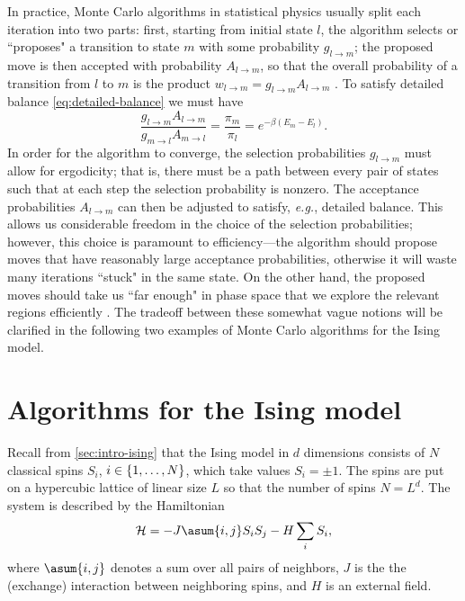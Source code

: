 In practice, Monte Carlo algorithms in statistical physics usually split each
iteration into two parts: first, starting from initial state $l$, the algorithm
selects or ``proposes" a transition to state $m$ with some probability
$g_{l \to m}$; the proposed move is then accepted with probability
$A_{l \to m}$, so that the overall probability of a transition from $l$ to $m$
is the product $w_{l \to m} = g_{l \to m} A_{l \to m}$
\autocite{newman1999monte}. To satisfy detailed balance
\eqref{eq:detailed-balance} we must have
\begin{equation}
  \frac{g_{l \to m} A_{l \to m}}{g_{m \to l} A_{m \to l}}
  = \frac{\pi_m}{\pi_l}
  = e^{-\beta(E_m - E_l)}.
  \label{eq:select-accept}
\end{equation}
In order for the algorithm to converge, the selection probabilities $g_{l \to
  m}$ must allow for ergodicity; that is, there must be a path between every
pair of states such that at each step the selection probability is nonzero. The
acceptance probabilities $A_{l \to m}$ can then be adjusted to satisfy,
\emph{e.g.}, detailed balance. This allows us considerable freedom in the
choice of the selection probabilities; however, this choice is paramount to
efficiency---the algorithm should propose moves that have reasonably large
acceptance probabilities, otherwise it will waste many iterations ``stuck" in
the same state. On the other hand, the proposed moves should take us ``far
enough" in phase space that we explore the relevant regions efficiently . The
tradeoff between these somewhat vague notions will be clarified in the
following two examples of Monte Carlo algorithms for the Ising model.


\section{Algorithms for the Ising model}

Recall from \cref{sec:intro-ising} that the Ising model in $d$ dimensions
consists of $N$ classical spins $S_i$, $i \in \cbr{1,\dots,N}$, which take
values $S_i = \pm 1$. The spins are put on a hypercubic lattice of linear size
$L$ so that the number of spins $N=L^d$. The system is described by the
Hamiltonian
\begin{equation}
  \ham = -J \asum{i,j} S_i S_j - H \sum_i S_i,
\end{equation}
where $\asum{i,j}$ denotes a sum over all pairs of neighbors, $J$ is the the
(exchange) interaction between neighboring spins, and $H$ is an external field.



